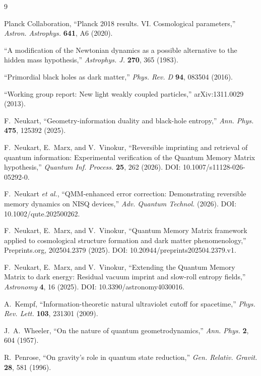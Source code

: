 \documentclass[12pt,a4paper]{article}
\begin{document}
\begin{thebibliography}{9}

Planck Collaboration,
``Planck 2018 results. VI. Cosmological parameters,''
\textit{Astron. Astrophys.} \textbf{641}, A6 (2020).

``A modification of the Newtonian dynamics as a possible alternative to the hidden mass hypothesis,''
\textit{Astrophys. J.} \textbf{270}, 365 (1983).

``Primordial black holes as dark matter,''
\textit{Phys. Rev. D} \textbf{94}, 083504 (2016).

``Working group report: New light weakly coupled particles,''
arXiv:1311.0029 (2013).

F.~Neukart,
``Geometry-information duality and black-hole entropy,''
\textit{Ann. Phys.} \textbf{475}, 125392 (2025).

F.~Neukart, E.~Marx, and V.~Vinokur,
``Reversible imprinting and retrieval of quantum information: Experimental verification of the Quantum Memory Matrix hypothesis,''
\textit{Quantum Inf. Process.} \textbf{25}, 262 (2026).
DOI: 10.1007/s11128-026-05292-0.

F.~Neukart \textit{et al.},
``QMM-enhanced error correction: Demonstrating reversible memory dynamics on NISQ devices,''
\textit{Adv. Quantum Technol.} (2026).
DOI: 10.1002/qute.202500262.

F.~Neukart, E.~Marx, and V.~Vinokur,
``Quantum Memory Matrix framework applied to cosmological structure formation and dark matter phenomenology,''
Preprints.org, 202504.2379 (2025).
DOI: 10.20944/preprints202504.2379.v1.

F.~Neukart, E.~Marx, and V.~Vinokur,
``Extending the Quantum Memory Matrix to dark energy: Residual vacuum imprint and slow-roll entropy fields,''
\textit{Astronomy} \textbf{4}, 16 (2025).
DOI: 10.3390/astronomy4030016.

A.~Kempf,
``Information-theoretic natural ultraviolet cutoff for spacetime,''
\textit{Phys. Rev. Lett.} \textbf{103}, 231301 (2009).

J.~A.~Wheeler,
``On the nature of quantum geometrodynamics,''
\textit{Ann. Phys.} \textbf{2}, 604 (1957).

R.~Penrose,
``On gravity's role in quantum state reduction,''
\textit{Gen. Relativ. Gravit.} \textbf{28}, 581 (1996).


\end{thebibliography}
\end{document}

